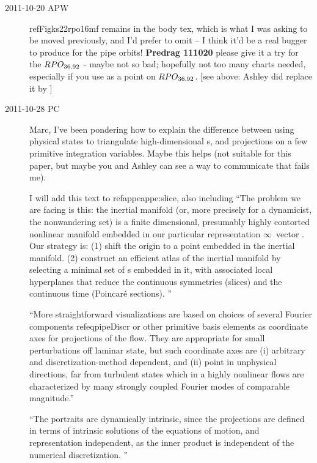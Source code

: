 \begin{description}
\item[2011-10-20 APW~~]
 refFig{ks22rpo16mf} remains in the body tex,
which is what I was asking to be moved previously, and I'd prefer to omit
-- I think it'd be a real bugger to produce for the pipe orbits!
{\bf Predrag 111020} please give it a try for the $RPO_{36.92}$ - maybe
not so bad; hopefully not too many charts needed, especially if you use
as {\template} a point on $RPO_{36.92}$.
[see above: Ashley did replace it by ]


\item[2011-10-28 PC~~] Marc, I've been pondering how to explain the
difference between using physical states to triangulate high-dimensional
\statesp s, and projections on a few primitive integration variables.
Maybe this helps (not suitable for this paper, but maybe you and Ashley
can see a way to communicate that fails me).

I will add this text to  refappe{appe:slice}, also including
    ``The problem we are facing is this: the inertial manifold
(or, more precisely for a dynamicist, the nonwandering set) is a
finite dimensional, presumably highly contorted nonlinear manifold
\citep{foias88}
embedded in our particular representation $\infty$\dmn\ vector \statesp.
Our strategy is: (1) shift the origin to a point embedded in the
inertial manifold. (2) construct an efficient atlas of the inertial manifold
by selecting a minimal set of \template s embedded in it, with associated
local hyperplanes that reduce the continuous symmetries (slices) and the
continuous time (Poincar\'e sections).
''

    ``More straightforward visualizations are based on choices of several Fourier
components  refeq{pipeDiscr} or other primitive basis elements as
coordinate axes for projections of the flow. They are appropriate for
small perturbations off laminar state, but such coordinate axes are (i)
arbitrary and discretization-method dependent, and (ii) point in
unphysical directions, far from turbulent states which in a highly
nonlinear flows are characterized by  many strongly coupled Fourier modes
of comparable magnitude.''

``The {\stateDsp} portraits are {dynamically intrinsic}, since the
projections are defined in terms of intrinsic solutions of the equations
of motion, and {representation independent}, as the inner product
 is independent of the numerical discretization.
''


\end{description}
